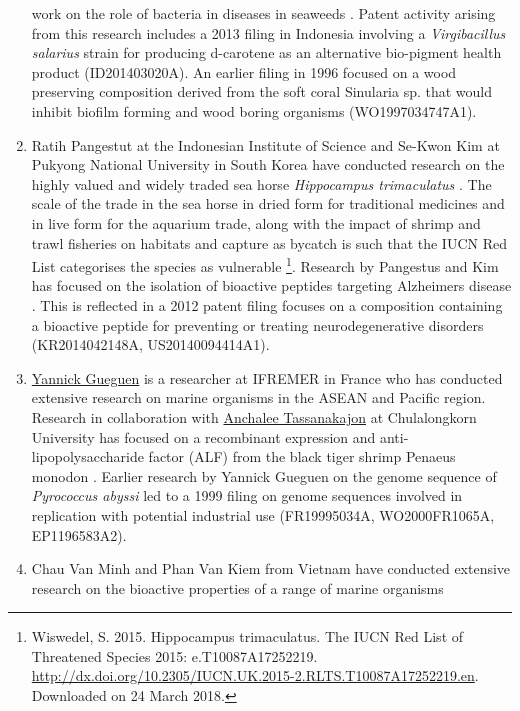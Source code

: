 \documentclass[]{book}
\theoremstyle{definition}
\theoremstyle{definition}
\theoremstyle{definition}
\theoremstyle{remark}
\begin{document}
\begin{enumerate}
  work on the role of bacteria in diseases in seaweeds
  \citep{Ayuningrum_2017, Trianto_2017, Syafitri_2017}. Patent activity
  arising from this research includes a 2013 filing in Indonesia
  involving a \emph{Virgibacillus salarius} strain for producing
  d-carotene as an alternative bio-pigment health product
  (ID201403020A). An earlier filing in 1996 focused on a wood preserving
  composition derived from the soft coral Sinularia sp. that would
  inhibit biofilm forming and wood boring organisms (WO1997034747A1).
\item
  Ratih Pangestut at the Indonesian Institute of Science and Se-Kwon Kim
  at Pukyong National University in South Korea have conducted research
  on the highly valued and widely traded sea horse \emph{Hippocampus
  trimaculatus} \citep{Pangestuti_2015}. The scale of the trade in the
  sea horse in dried form for traditional medicines and in live form for
  the aquarium trade, along with the impact of shrimp and trawl
  fisheries on habitats and capture as bycatch is such that the IUCN Red
  List categorises the species as vulnerable \footnote{Wiswedel, S.
    2015. Hippocampus trimaculatus. The IUCN Red List of Threatened
    Species 2015: e.T10087A17252219.
    \url{http://dx.doi.org/10.2305/IUCN.UK.2015-2.RLTS.T10087A17252219.en}.
    Downloaded on 24 March 2018.}. Research by Pangestus and Kim has
  focused on the isolation of bioactive peptides targeting Alzheimers
  disease \citep{Pangestuti_2015}. This is reflected in a 2012 patent
  filing focuses on a composition containing a bioactive peptide for
  preventing or treating neurodegenerative disorders (KR2014042148A,
  US20140094414A1).
\item
  \href{http://orcid.org/0000-0002-8749-9582}{Yannick Gueguen} is a
  researcher at IFREMER in France who has conducted extensive research
  on marine organisms in the ASEAN and Pacific region. Research in
  collaboration with
  \href{http://www.bc.sc.chula.ac.th/11Anchalee.html}{Anchalee
  Tassanakajon} at Chulalongkorn University has focused on a recombinant
  expression and anti-lipopolysaccharide factor (ALF) from the black
  tiger shrimp Penaeus monodon \citep{SOMBOONWIWAT_2005}. Earlier
  research by Yannick Gueguen on the genome sequence of \emph{Pyrococcus
  abyssi} led to a 1999 filing on genome sequences involved in
  replication with potential industrial use (FR19995034A, WO2000FR1065A,
  EP1196583A2).
\item
  Chau Van Minh and Phan Van Kiem from Vietnam have conducted extensive
  research on the bioactive properties of a range of marine organisms

\end{enumerate}
\end{document}
